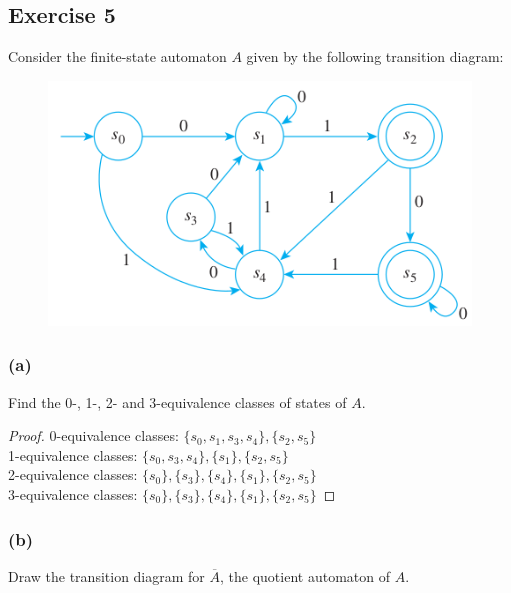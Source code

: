 \documentclass[14pt]{extarticle}
\begin{document}
\subsection{Exercise 5}
Consider the finite-state automaton \(A\) given by the following transition diagram:

\begin{figure}[ht!]
\centering
\includegraphics[scale=0.5]{../images/12.3.5.png}
\end{figure}

\subsubsection{(a)}
Find the 0-, 1-, 2- and 3-equivalence classes of states of \(A\).

\begin{proof}
0-equivalence classes: \(\{s_0, s_1, s_3, s_4\}, \{s_2, s_5\}\) \\
1-equivalence classes: \(\{s_0, s_3, s_4\}, \{s_1\}, \{s_2, s_5\}\) \\
2-equivalence classes: \(\{s_0\}, \{s_3\}, \{s_4\}, \{s_1\}, \{s_2, s_5\}\) \\
3-equivalence classes: \(\{s_0\}, \{s_3\}, \{s_4\}, \{s_1\}, \{s_2, s_5\}\)
\end{proof}

\subsubsection{(b)}
Draw the transition diagram for \(\overline{A}\), the quotient automaton of \(A\).
\end{document}
